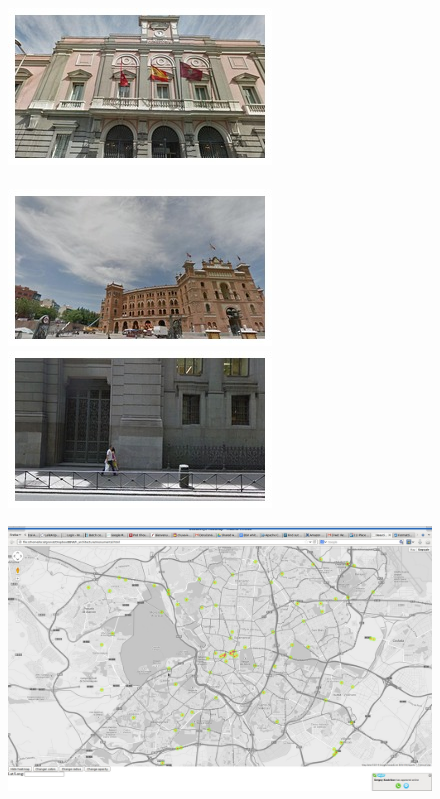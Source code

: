 \begin{figure}[t]
\begin{minipage}{\linewidth}
\begin{minipage}{0.3\linewidth}
      \includegraphics[width=0.49\linewidth]{imgs/arch/mosaicsS1/mosaic0025.jpg}
      \\ \vspace{-3mm} \\
      \includegraphics[width=0.49\linewidth]{imgs/arch/mosaicsS1/mosaic0030.jpg}
      \includegraphics[width=0.49\linewidth]{imgs/arch/mosaicsS1/mosaic0032.jpg}
    \end{minipage}
    \begin{minipage}{0.7\linewidth}
      \includegraphics[trim= 350 150 250 150, clip=true, width=\linewidth]{imgs/arch/mapS1.jpg}

\end{minipage}
\end{minipage}
\end{figure}
